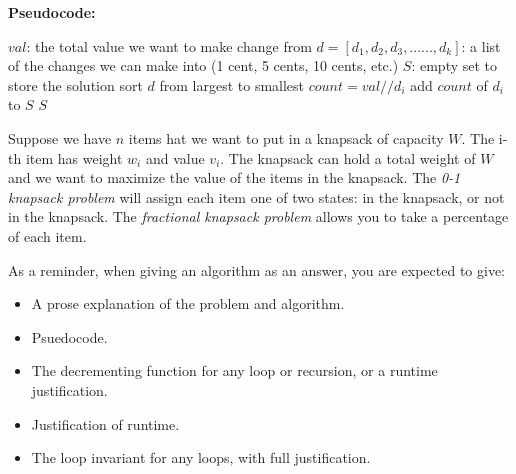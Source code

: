 \documentclass{article}
\begin{document}
\textbf{Pseudocode:}
\begin{algorithm}
            \begin{algorithmic}
            \State $val$: the total value we want to make change from
            \State $d = [d_1, d_2, d_3, ......, d_k]$: a list of the changes we can make into (1 cent, 5 cents, 10 cents, etc.)
                    \State $S$: empty set to store the solution
                    \State sort $d$ from largest to smallest
                        \State $count = val // d_i$
                        \State add $count$ of $d_i$ to $S$  
                    \EndFor
                    \newline
                    \Return $S$
                \EndFunction
            \end{algorithmic}
            \end{algorithm}


\nextprob
Suppose we have $n$ items hat we want to put in a knapsack of capacity $W$.  The i-th item has
weight $w_i$ and value $v_i$.  The knapsack can hold a total weight of $W$ and
we want to maximize the value of the items in the knapsack.
The \emph{0-1 knapsack problem} will assign each item one of two states: in the
knapsack, or not in the knapsack.  The \emph{fractional knapsack problem} allows
you to take a percentage of each item.

As a reminder, when giving an algorithm as an answer, you
are expected to give:
\begin{itemize}
    \item A prose explanation of the problem and algorithm.
    \item Psuedocode.
    \item The decrementing function for any loop or recursion, or a runtime
        justification.
    \item Justification of runtime.
    \item The loop invariant for any loops, with full justification.
\end{itemize}
\end{document}
